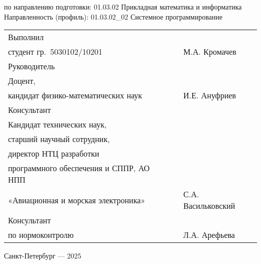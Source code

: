 \noindent	по направлению подготовки: 01.03.02 Прикладная математика и информатика\\%
\noindent	Направленность (профиль):	01.03.02\_02 Системное программирование %
\par%





\vspace{4mm plus2fill}%

\noindent
\begin{tabularx}{\linewidth}{lXl}
	Выполнил              &	   &             \\
	студент гр.~5030102/10201     &    &
	М.А. Кромачев     \\[\mfloatsep]

	Руководитель 		  &    &             \\
	Доцент,		  &    &             \\
	кандидат физико-математических наук 	  &    & 
	И.Е. Ануфриев \\[\mfloatsep]
	
	Консультант		  &  & 			 \\
	Кандидат технических наук, \\ старший научный сотрудник, \\
	директор НТЦ разработки \\ программного обеспечения и СППР, АО НПП\\
	«Авиационная и морская электроника» 	  &    & С.А. Васильковский\\[\mfloatsep]
	
	Консультант  &    &  \\   	
	по нормоконтролю	&   & 
	Л.А. Арефьева  %
\end{tabularx} %


%
\vspace{0pt plus4fill}%


\begin{center}%
Санкт-Петербург --- 2025\\
\end{center}%
\restoregeometry
\newpage